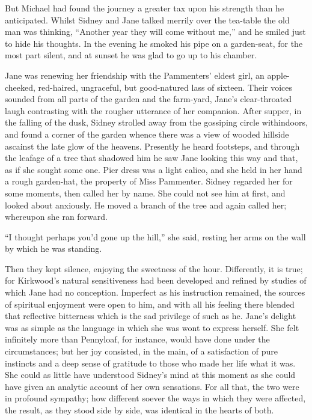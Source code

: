 But Michael had found the journey a greater tax upon his strength than
he anticipated. Whilst Sidney and Jane talked merrily over the tea-table
the old man was thinking, {}``Another year they will come without me,''
and he smiled just to hide his thoughts. In the evening he smoked his
pipe on a garden-seat, for the most part silent, and at sunset he was
glad to go up to his chamber.

Jane was renewing her friendship with the Pammenters' eldest girl, an
apple-cheeked, red-haired, ungraceful, but good-natured lass of sixteen.
Their voices sounded from all parts of the garden and the farm-yard,
Jane's clear-throated laugh contrasting with the rougher utterance of
her companion. After supper, in the falling of the dusk, Sidney strolled
away from the gossiping circle withindoors, and found a corner of the
garden whence there was a view of wooded hillside ascainst the late glow
of the heavens. Presently he heard footsteps, and through the leafage of
a tree that shadowed him he saw Jane looking this way and that, as if
she sought some one. Pier dress was a light calico, and she held in her
hand a rough garden-hat, the property of Miss Pammenter. Sidney regarded
her for some moments, then called her by name. {}She could not see him
at first, and looked about anxiously. He moved a branch of the tree and
again called her; whereupon she ran forward.

``I thought perhaps you'd gone up the hill,'' she said, resting her arms
on the wall by which he was standing.

Then they kept silence, enjoying the sweetness of the hour. Differently,
it is true; for Kirkwood's natural sensitiveness had been developed and
refined by studies of which Jane had no conception. Imperfect as his
instruction remained, the sources of spiritual enjoyment were open to
him, and with all his feeling there blended that reflective bitterness
which is the sad privilege of such as he. Jane's delight was as simple
as the language in which she was wont to express herself. She felt
infinitely more than Pennyloaf, for instance, would have done under the
circumstances; but her joy consisted, in the main, of a satisfaction of
pure instincts and a deep sense of gratitude to those who made her life
what it was. She could as little have {}understood Sidney's mind at this
moment as she could have given an analytic account of her own
sensations. For all that, the two were in profound sympathy; how
different soever the ways in which they were affected, the result, as
they stood side by side, was identical in the hearts of both.

